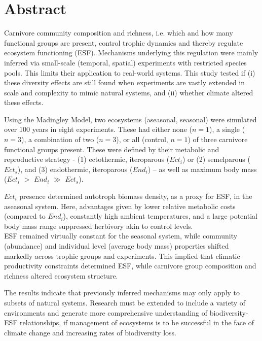 \section*{Abstract}
\label{Abstract}
\onehalfspacing
Carnivore community composition and richness, i.e. which and how many functional groups are present, control trophic dynamics  and thereby regulate ecosystem functioning (ESF). Mechanisms underlying this regulation were mainly inferred via small-scale (temporal, spatial) experiments with restricted species pools. This limits their application to real-world systems.
This study tested if (i) these diversity effects are still found when experiments are vastly extended in scale and complexity to mimic natural systems, and (ii) whether climate altered these effects. 

Using the Madingley Model, two ecosystems (aseasonal, seasonal) were simulated over 100 years in eight experiments. These had either none ($n = 1$), a single ($ n = 3$), a combination of two ($n = 3$), or all (control, $n = 1$) of three carnivore functional groups present. These were defined by their metabolic and reproductive strategy - (1) ectothermic, iteroparous ($Ect_i$) or (2) semelparous ($Ect_s$), and (3) endothermic, iteroparous ($End_i$) – as well as maximum body mass ($Ect_i$ $>$ $End_i$ $\gg$ $Ect_s$).

$Ect_i$ presence determined autotroph biomass density, as a proxy for ESF, in the aseasonal system. Here, advantages given by lower relative metabolic costs (compared to $End_i$), constantly high ambient temperatures, and a large potential body mass range suppressed herbivory akin to control levels. \\
ESF remained virtually constant for the seasonal system, while community (abundance) and individual level (average body mass) properties shifted markedly across trophic groups and experiments. This implied that climatic productivity constraints determined ESF, while carnivore group composition and richness altered ecosystem structure. 


The results indicate that previously inferred mechanisms may only apply to subsets of natural systems. Research must be extended to include a variety of environments and generate more comprehensive understanding of biodiversity-ESF relationships, if management of ecosystems is to be successful in the face of climate change and increasing rates of biodiversity loss.






